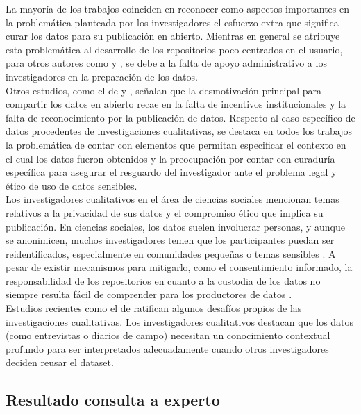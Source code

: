 \documentclass[runningheads]{llncs}
\begin{document}
La mayoría de los trabajos coinciden en reconocer como aspectos importantes en la problemática planteada por los investigadores el esfuerzo extra que significa curar los datos para su publicación en abierto.  Mientras en general se atribuye esta problemática al desarrollo de los repositorios poco centrados en el usuario, para otros autores como \citet{borycz2023} y \citet{casali2022open}, se debe a la falta de apoyo administrativo a los investigadores en la preparación de los datos.\\

Otros estudios, como el de \citet{grattarola2024gaps} y \citet{ mabile2025recommendations}, señalan que la desmotivación principal para compartir los datos en abierto  recae en la falta de incentivos institucionales y la falta de reconocimiento por la publicación de datos.
Respecto al caso específico de datos procedentes de investigaciones cualitativas, se destaca en todos los trabajos la problemática de contar con elementos que permitan especificar el contexto en el cual los datos fueron obtenidos y la preocupación por contar con curaduría específica para asegurar el resguardo del investigador ante el problema legal y ético de uso de datos sensibles.\\

Los investigadores cualitativos en el área de ciencias sociales mencionan temas relativos a la privacidad de sus datos y el compromiso ético que implica su publicación. En ciencias sociales, los datos suelen involucrar personas, y aunque se anonimicen, muchos investigadores temen que los participantes puedan ser reidentificados, especialmente en comunidades pequeñas o temas sensibles \citep{kraehmer2023}. A pesar de existir mecanismos para mitigarlo, como el consentimiento informado, la responsabilidad de los repositorios en cuanto a la custodia de los datos no siempre resulta fácil de comprender para los productores de datos \citep{prosser2022}.\\

Estudios recientes como el de \citet{Lamb2024} ratifican algunos desafíos propios de las investigaciones cualitativas. Los investigadores cualitativos destacan que los datos (como entrevistas o diarios de campo) necesitan un conocimiento contextual profundo para ser interpretados adecuadamente cuando otros investigadores deciden reusar el dataset. \\

\subsection{Resultado consulta a experto}
\end{document}
